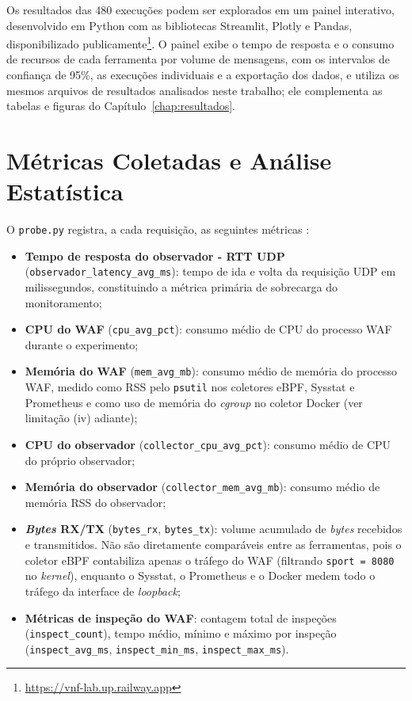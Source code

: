 Os resultados das 480 execuções podem ser explorados em um painel interativo, desenvolvido em Python com as bibliotecas Streamlit, Plotly e Pandas, disponibilizado publicamente\footnote{\url{https://vnf-lab.up.railway.app}}. O painel exibe o tempo de resposta e o consumo de recursos de cada ferramenta por volume de mensagens, com os intervalos de confiança de 95\%, as execuções individuais e a exportação dos dados, e utiliza os mesmos arquivos de resultados analisados neste trabalho; ele complementa as tabelas e figuras do Capítulo~\ref{chap:resultados}.

\section{Métricas Coletadas e Análise Estatística}

O \texttt{probe.py} registra, a cada requisição, as seguintes métricas \cite{rfc8172}:

\begin{itemize}
    \item \textbf{Tempo de resposta do observador - RTT UDP} (\texttt{observador\_latency\_avg\_ms}): tempo de ida e volta da requisição UDP em milissegundos, constituindo a métrica primária de sobrecarga do monitoramento;
    \item \textbf{CPU do WAF} (\texttt{cpu\_avg\_pct}): consumo médio de CPU do processo WAF durante o experimento;
    \item \textbf{Memória do WAF} (\texttt{mem\_avg\_mb}): consumo médio de memória do processo WAF, medido como RSS pelo \texttt{psutil} nos coletores eBPF, Sysstat e Prometheus e como uso de memória do \textit{cgroup} no coletor Docker (ver limitação (iv) adiante);
    \item \textbf{CPU do observador} (\texttt{collector\_cpu\_avg\_pct}): consumo médio de CPU do próprio observador;
    \item \textbf{Memória do observador} (\texttt{collector\_mem\_avg\_mb}): consumo médio de memória RSS do observador;
    \item \textbf{\textit{Bytes} RX/TX} (\texttt{bytes\_rx}, \texttt{bytes\_tx}): volume acumulado de \textit{bytes} recebidos e transmitidos. Não são diretamente comparáveis entre as ferramentas, pois o coletor eBPF contabiliza apenas o tráfego do WAF (filtrando \texttt{sport = 8080} no \textit{kernel}), enquanto o Sysstat, o Prometheus e o Docker medem todo o tráfego da interface de \textit{loopback};
    \item {\raggedright\textbf{Métricas de inspeção do WAF}: contagem total de inspeções (\texttt{inspect\_count}), tempo médio, mínimo e máximo por inspeção (\texttt{inspect\_avg\_ms}, \texttt{inspect\_min\_ms}, \texttt{inspect\_max\_ms}).\par}
\end{itemize}

